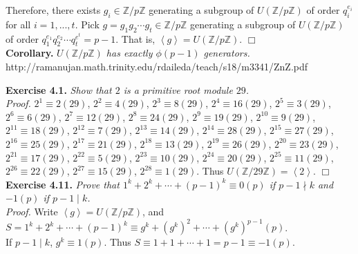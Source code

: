 \documentclass{article}
\begin{document}
Therefore, there exists $g_i \in \mathbb{Z}/p\mathbb{Z}$ generating a subgroup of
$U(\mathbb{Z}/p\mathbb{Z})$ of order $q_i^{e_i}$ for all $i = 1, ..., t$.
Pick $g = g_1 g_2 \cdots g_t \in \mathbb{Z}/p\mathbb{Z}$ generating a subgroup of
$U(\mathbb{Z}/p\mathbb{Z})$ of order $q_1^{e_1} q_2^{e_2} \cdots q_t^{e^t} = p - 1$.
That is, $\left \langle g \right \rangle = U(\mathbb{Z}/p\mathbb{Z})$.
$\Box$ \\

\textbf{Corollary.} \emph{$U(\mathbb{Z}/p\mathbb{Z})$ has exactly $\phi(p - 1)$ generators.} \\

http://ramanujan.math.trinity.edu/rdaileda/teach/s18/m3341/ZnZ.pdf

\textbf{Exercise 4.1.} \emph{Show that $2$ is a primitive root module $29$.}\\

\emph{Proof.}
$2^1 \equiv 2 (29)$,
$2^2 \equiv 4 (29)$,
$2^3 \equiv 8 (29)$,
$2^4 \equiv 16 (29)$,
$2^5 \equiv 3 (29)$,
$2^6 \equiv 6 (29)$,
$2^7 \equiv 12 (29)$,
$2^8 \equiv 24 (29)$,
$2^9 \equiv 19 (29)$,
$2^{10} \equiv 9 (29)$,
$2^{11} \equiv 18 (29)$,
$2^{12} \equiv 7 (29)$,
$2^{13} \equiv 14 (29)$,
$2^{14} \equiv 28 (29)$,
$2^{15} \equiv 27 (29)$,
$2^{16} \equiv 25 (29)$,
$2^{17} \equiv 21 (29)$,
$2^{18} \equiv 13 (29)$,
$2^{19} \equiv 26 (29)$,
$2^{20} \equiv 23 (29)$,
$2^{21} \equiv 17 (29)$,
$2^{22} \equiv 5 (29)$,
$2^{23} \equiv 10 (29)$,
$2^{24} \equiv 20 (29)$,
$2^{25} \equiv 11 (29)$,
$2^{26} \equiv 22 (29)$,
$2^{27} \equiv 15 (29)$,
$2^{28} \equiv 1 (29)$. Thus
$U(\mathbb{Z}/29\mathbb{Z}) = \left \langle 2 \right \rangle$.
$\Box$ \\

\textbf{Exercise 4.11.} \emph{Prove that $1^k + 2^k + \cdots + (p-1)^k \equiv 0 (p)$
if $p - 1 \nmid k$ and $-1 (p)$ if $p - 1 \mid k$.} \\

\emph{Proof.}
Write $\left \langle g \right \rangle = U(\mathbb{Z}/p\mathbb{Z})$, and
$S = 1^k + 2^k + \cdots + (p-1)^k \equiv g^k + (g^k)^2 + \cdots + (g^k)^{p - 1} (p)$. \\

If $p - 1 \mid k$, $g^k \equiv 1 (p)$. Thus
$S \equiv 1 + 1 + \cdots + 1 = p - 1 \equiv -1 (p)$. \\
\end{document}

